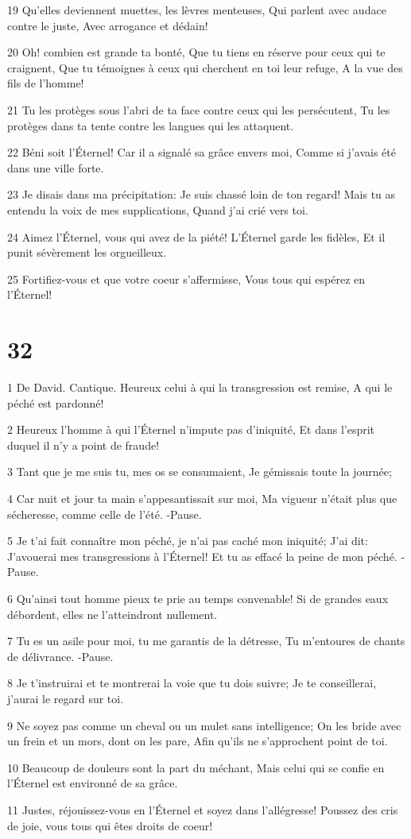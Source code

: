 \par 19 Qu'elles deviennent muettes, les lèvres menteuses, Qui parlent avec audace contre le juste, Avec arrogance et dédain!
\par 20 Oh! combien est grande ta bonté, Que tu tiens en réserve pour ceux qui te craignent, Que tu témoignes à ceux qui cherchent en toi leur refuge, A la vue des fils de l'homme!
\par 21 Tu les protèges sous l'abri de ta face contre ceux qui les persécutent, Tu les protèges dans ta tente contre les langues qui les attaquent.
\par 22 Béni soit l'Éternel! Car il a signalé sa grâce envers moi, Comme si j'avais été dans une ville forte.
\par 23 Je disais dans ma précipitation: Je suis chassé loin de ton regard! Mais tu as entendu la voix de mes supplications, Quand j'ai crié vers toi.
\par 24 Aimez l'Éternel, vous qui avez de la piété! L'Éternel garde les fidèles, Et il punit sévèrement les orgueilleux.
\par 25 Fortifiez-vous et que votre coeur s'affermisse, Vous tous qui espérez en l'Éternel!

\chapter{32}

\par 1 De David. Cantique. Heureux celui à qui la transgression est remise, A qui le péché est pardonné!
\par 2 Heureux l'homme à qui l'Éternel n'impute pas d'iniquité, Et dans l'esprit duquel il n'y a point de fraude!
\par 3 Tant que je me suis tu, mes os se consumaient, Je gémissais toute la journée;
\par 4 Car nuit et jour ta main s'appesantissait sur moi, Ma vigueur n'était plus que sécheresse, comme celle de l'été. -Pause.
\par 5 Je t'ai fait connaître mon péché, je n'ai pas caché mon iniquité; J'ai dit: J'avouerai mes transgressions à l'Éternel! Et tu as effacé la peine de mon péché. -Pause.
\par 6 Qu'ainsi tout homme pieux te prie au temps convenable! Si de grandes eaux débordent, elles ne l'atteindront nullement.
\par 7 Tu es un asile pour moi, tu me garantis de la détresse, Tu m'entoures de chants de délivrance. -Pause.
\par 8 Je t'instruirai et te montrerai la voie que tu dois suivre; Je te conseillerai, j'aurai le regard sur toi.
\par 9 Ne soyez pas comme un cheval ou un mulet sans intelligence; On les bride avec un frein et un mors, dont on les pare, Afin qu'ils ne s'approchent point de toi.
\par 10 Beaucoup de douleurs sont la part du méchant, Mais celui qui se confie en l'Éternel est environné de sa grâce.
\par 11 Justes, réjouissez-vous en l'Éternel et soyez dans l'allégresse! Poussez des cris de joie, vous tous qui êtes droits de coeur!


